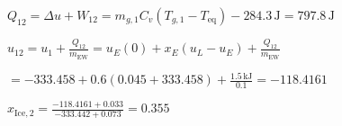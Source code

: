 \( Q_{12} = \Delta u + W_{12} = m_{g,1} C_v (T_{g,1} - T_{\text{eq}}) - 284.3 \, \text{J} = 797.8 \, \text{J} \)  

\( u_{12} = u_1 + \frac{Q_{12}}{m_{\text{EW}}} = u_E(0) + x_E (u_{L} - u_E) + \frac{Q_{12}}{m_{\text{EW}}} \)  

\( = -333.458 + 0.6 (0.045 + 333.458) + \frac{1.5 \, \text{kJ}}{0.1} = -118.4161 \)  

\( x_{\text{Ice},2} = \frac{-118.4161 + 0.033}{-333.442 + 0.073} = 0.355 \)